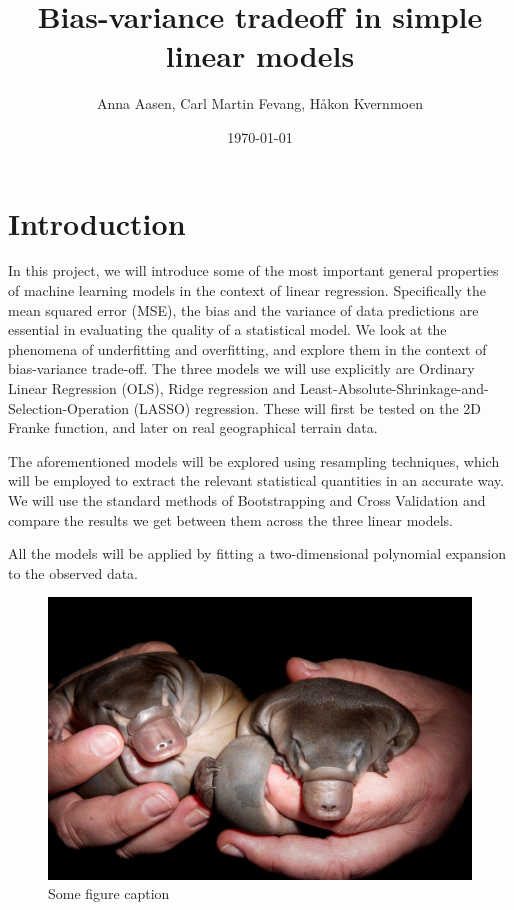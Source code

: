 \documentclass[twocolumn,english,notitlepage]{article}
\title{Bias-variance tradeoff in simple linear models} %
\author{Anna Aasen, Carl Martin Fevang, Håkon Kvernmoen}
\date{\today}
\begin{document}

\section{Introduction}
    In this project, we will introduce some of the most important general properties of machine learning models in the context of linear regression. Specifically the mean squared error (MSE), the bias and the variance of data predictions are essential in evaluating the quality of a statistical model. We look at the phenomena of underfitting and overfitting, and explore them in the context of bias-variance trade-off. The three models we will use explicitly are Ordinary Linear Regression (OLS), Ridge regression and Least-Absolute-Shrinkage-and-Selection-Operation (LASSO) regression. These will first be tested on the 2D Franke function, and later on real geographical terrain data.

    The aforementioned models will be explored using resampling techniques, which will be employed to extract the relevant statistical quantities in an accurate way. We will use the standard methods of Bootstrapping and Cross Validation and compare the results we get between them across the three linear models.

    All the models will be applied by fitting a two-dimensional polynomial expansion to the observed data.



\begin{figure}[H]\label{fig:intro:plat}
    \centering
    \includegraphics[width=0.5\linewidth]{Young-Platypus.jpg}
    \caption{Some figure caption}
\end{figure}
\end{document}
